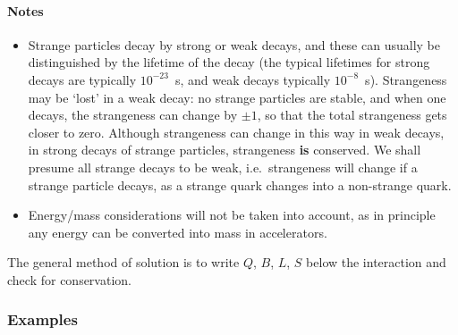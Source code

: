 \documentclass[a4paper,12pt]{article}
\begin{document}
\paragraph{Notes}
\begin{itemize}
\item Strange particles decay by strong or weak decays, and these can usually be distinguished by the lifetime of the decay (the typical lifetimes for strong decays are typically $10^{-23}$~s, and weak decays typically $10^{-8}$~s).  Strangeness may be `lost' in a weak decay: no strange particles are stable, and when one decays, the strangeness can change by $\pm 1$, so that the total strangeness gets closer to zero.  Although strangeness can change in this way in weak decays, in strong decays of strange particles, strangeness {\bf is} conserved. We shall presume all strange decays to be weak, i.e.\ strangeness will change if a strange particle decays, as a strange quark changes into a non-strange quark.
\item Energy/mass considerations will not be taken into account, as in principle any energy can be converted into mass in accelerators.
\end{itemize}

The general method of solution is to write $Q$, $B$, $L$, $S$ below the interaction and check for conservation.

\subsubsection{Examples}
\end{document}

